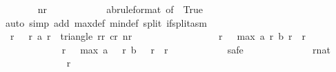 \begin{isabellebody}
\isanewline
\ \ \ \ \ \ \isamarkupfalse%
\ {\isachardoublequoteopen}{\isacharquery}nr\ {\isasymge}\ {}{}{}{}{\isachardoublequoteclose}\isanewline
\ \ \ \ \ \ \ \ \isamarkupfalse%
\ ab{\isacharbrackleft}rule{\isacharunderscore}format{\isacharcomma}\ of\ {}{}{}{}{\isacharbrackright}\ True\isanewline
\ \ \ \ \ \ \ \ \isamarkupfalse%
\ {\isacharparenleft}auto\ simp\ add{\isacharcolon}\ max{\isacharunderscore}def\ min{\isacharunderscore}def\ split{\isacharcolon}\ if{\isacharunderscore}split{\isacharunderscore}asm{\isacharparenright}\isanewline
\ \ \ \ \isamarkupfalse%
\isanewline
\ \ \ \ \ \ \isamarkupfalse%
\ {\isachardoublequoteopen}{\isasymforall}\ r\ {\isacharless}\ {}{}{}{}{\isachardot}\ {\isacharparenleft}r{\isacharcomma}\ a\ r{\isacharparenright}\ {\isasymnotin}\ triangle\ {\isacharquery}r{}r\ {\isacharquery}c{}r\ {\isacharquery}nr{\isachardoublequoteclose}\isanewline
\ \ \ \ \ \ \isamarkupfalse%
{\isacharminus}\isanewline
\ \ \ \ \ \ \ \ \isamarkupfalse%
\ {\isachardoublequoteopen}{\isasymforall}\ r\ {\isacharless}\ {}{}{}{}{\isachardot}\ max\ {\isacharparenleft}a\ r{\isacharparenright}\ {\isacharparenleft}b\ r{\isacharparenright}\ {\isasymle}\ {\isacharquery}r{\isachardoublequoteclose}\isanewline
\ \ \ \ \ \ \ \ \isamarkupfalse%
{\isacharminus}\isanewline
\ \ \ \ \ \ \ \ \ \ \isamarkupfalse%
\ {\isachardoublequoteopen}{\isasymforall}\ r\ {\isacharless}\ {}{}{}{}{\isachardot}\ max\ {\isacharparenleft}a\ {\isacharparenleft}{}{}{}{}\ {\isacharminus}\ r{\isacharparenright}{\isacharparenright}\ {\isacharparenleft}b\ {\isacharparenleft}{}{}{}{}\ {\isacharminus}\ r{\isacharparenright}{\isacharparenright}\ {\isasymle}\ {\isacharquery}r{\isachardoublequoteclose}\isanewline
\ \ \ \ \ \ \ \ \ \ \isamarkupfalse%
\ safe\isanewline
\ \ \ \ \ \ \ \ \ \ \ \ \isamarkupfalse%
\ r{\isacharcolon}{\isacharcolon}nat\isanewline
\ \ \ \ \ \ \ \ \ \ \ \ \isamarkupfalse%
\ {\isachardoublequoteopen}r\ {\isacharless}\ {}{}{}{}{\isachardoublequoteclose}\isanewline
\ \ \ \ \ \ \ \ \ \ \ \ \isamarkupfalse%

\end{isabellebody}
